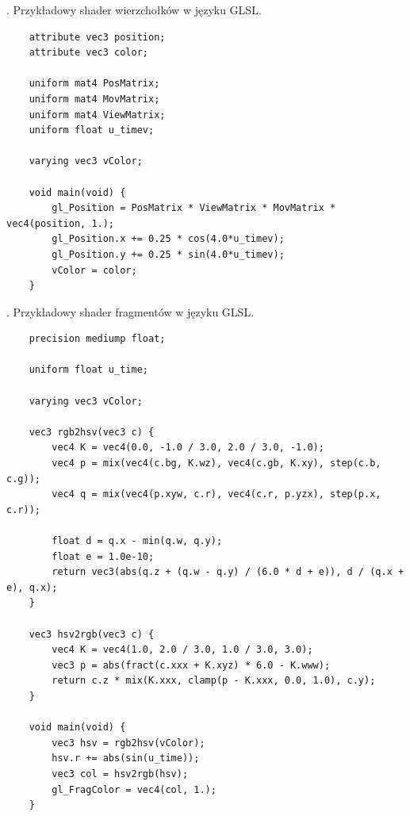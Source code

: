 \documentclass[a4paper,11pt]{article}
\begin{document}
. Przykładowy shader wierzchołków w języku GLSL.
\begin{verbatim}
	attribute vec3 position;
	attribute vec3 color;

	uniform mat4 PosMatrix;
	uniform mat4 MovMatrix;
	uniform mat4 ViewMatrix;
	uniform float u_timev;

	varying vec3 vColor;
	
	void main(void) {
		gl_Position = PosMatrix * ViewMatrix * MovMatrix * vec4(position, 1.);
		gl_Position.x += 0.25 * cos(4.0*u_timev);
		gl_Position.y += 0.25 * sin(4.0*u_timev);
		vColor = color;
	}
\end{verbatim}
\newpage

. Przykładowy shader fragmentów w języku GLSL.
\begin{verbatim}
	precision mediump float;

	uniform float u_time;

	varying vec3 vColor;
	
	vec3 rgb2hsv(vec3 c) {
	    vec4 K = vec4(0.0, -1.0 / 3.0, 2.0 / 3.0, -1.0);
	    vec4 p = mix(vec4(c.bg, K.wz), vec4(c.gb, K.xy), step(c.b, c.g));
	    vec4 q = mix(vec4(p.xyw, c.r), vec4(c.r, p.yzx), step(p.x, c.r));
	
	    float d = q.x - min(q.w, q.y);
	    float e = 1.0e-10;
	    return vec3(abs(q.z + (q.w - q.y) / (6.0 * d + e)), d / (q.x + e), q.x);
	}
	
	vec3 hsv2rgb(vec3 c) {
	    vec4 K = vec4(1.0, 2.0 / 3.0, 1.0 / 3.0, 3.0);
	    vec3 p = abs(fract(c.xxx + K.xyz) * 6.0 - K.www);
	    return c.z * mix(K.xxx, clamp(p - K.xxx, 0.0, 1.0), c.y);
	}
	
	void main(void) {
		vec3 hsv = rgb2hsv(vColor);
		hsv.r += abs(sin(u_time)); 
		vec3 col = hsv2rgb(hsv);
		gl_FragColor = vec4(col, 1.);
	}
\end{verbatim}
\newpage
\end{document}
